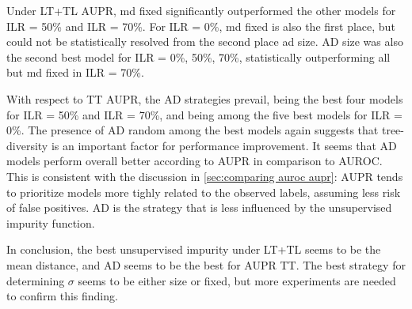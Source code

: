 Under LT+TL AUPR, md fixed significantly outperformed the other models for ILR = 50\% and ILR = 70\%. For ILR = 0\%, md fixed is also the first place, but could not be statistically resolved from the second place ad size. AD size was also the second best model for ILR = 0\%, 50\%, 70\%, statistically outperforming all but md fixed in ILR = 70\%.

With respect to TT AUPR, the AD strategies prevail, being the best four models for ILR = 50\% and ILR = 70\%, and being among the five best models for ILR = 0\%. The presence of AD random among the best models again suggests that tree-diversity is an important factor for performance improvement.
%
It seems that AD models perform overall better according to AUPR in comparison to AUROC. This is consistent with the discussion in \autoref{sec:comparing auroc aupr}: AUPR tends to prioritize models more tighly related to the observed labels, assuming less risk of false positives. AD is the strategy that is less influenced by the unsupervised impurity function.

In conclusion, the best unsupervised impurity under LT+TL seems to be the mean distance, and AD seems to be the best for AUPR TT. The best strategy for determining $\sigma$ seems to be either size or fixed, but more experiments are needed to confirm this finding.


